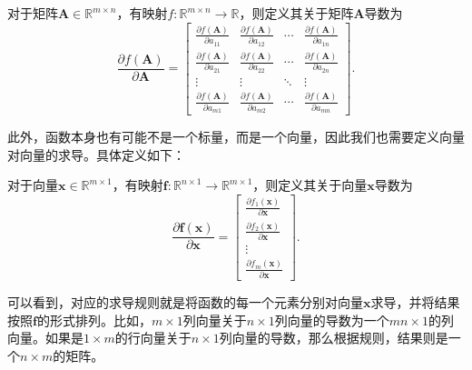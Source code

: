 \begin{definition}[标量关于矩阵求导]
    对于矩阵$\mathbf{A} \in \mathbb{R}^{m \times n}$，有映射\( f: \mathbb{R}^{m \times n} \rightarrow \mathbb{R} \)，则定义其关于矩阵\( \mathbf{A} \)导数为
    \[
        \frac{\partial f(\mathbf{A})}{\partial \mathbf{A}} =
        \begin{bmatrix}
            \frac{\partial f(\mathbf{A})}{\partial a_{11}} & \frac{\partial f(\mathbf{A})}{\partial a_{12}} & \cdots & \frac{\partial f(\mathbf{A})}{\partial a_{1n}} \\
            \frac{\partial f(\mathbf{A})}{\partial a_{21}} & \frac{\partial f(\mathbf{A})}{\partial a_{22}} & \cdots & \frac{\partial f(\mathbf{A})}{\partial a_{2n}} \\
            \vdots                                         & \vdots                                         & \ddots & \vdots                                         \\
            \frac{\partial f(\mathbf{A})}{\partial a_{m1}} & \frac{\partial f(\mathbf{A})}{\partial a_{m2}} & \cdots & \frac{\partial f(\mathbf{A})}{\partial a_{mn}}
        \end{bmatrix}.
    \]
\end{definition}

此外，函数本身也有可能不是一个标量，而是一个向量，因此我们也需要定义向量对向量的求导。具体定义如下：

\begin{definition}[向量关于向量求导]
    对于向量\( \bm{x} \in \mathbb{R}^{m \times 1} \)，有映射\( \bm{f}: \mathbb{R}^{n \times 1} \rightarrow \mathbb{R}^{m \times 1} \)，则定义其关于向量\( \bm{x} \)导数为
    \[
        \frac{\partial \bm{f}(\bm{x})}{\partial \bm{x}} =
        \begin{bmatrix}
            \frac{\partial f_1(\bm{x})}{\partial \bm{x}} \\
            \frac{\partial f_2(\bm{x})}{\partial \bm{x}} \\
            \vdots                                       \\
            \frac{\partial f_m(\bm{x})}{\partial \bm{x}}
        \end{bmatrix}.
    \]
\end{definition}
可以看到，对应的求导规则就是将函数的每一个元素分别对向量\( \bm{x} \)求导，并将结果按照\( \bm{f} \)的形式排列。比如，\( m \times 1 \)列向量关于\( n \times 1 \)列向量的导数为一个\( mn \times 1 \)的列向量。如果是\( 1 \times m \)的行向量关于\( n \times 1 \)列向量的导数，那么根据规则，结果则是一个\( n \times m \)的矩阵。

